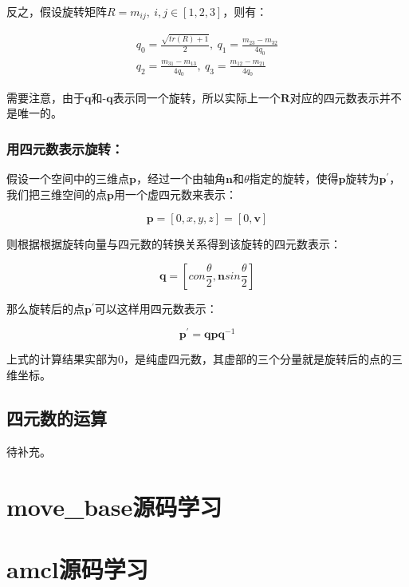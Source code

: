 \documentclass[10pt, oneside]{book}
\begin{document}
反之，假设旋转矩阵$R = {m_{ij}},\ i,j\in [1,2,3]$，则有：

\begin{equation}
    \begin{split}
        q_0 = \frac{\sqrt{tr(R)+1}}{2},\ 
        q_1 = \frac{m_{23}-m_{32}}{4q_0}\\
        q_2 = \frac{m_{31}-m_{13}}{4q_0},\ 
        q_3 = \frac{m_{12}-m_{21}}{4q_0}
    \end{split}
\end{equation}

需要注意，由于$\textbf{q}$和$\textbf{-q}$表示同一个旋转，所以实际上一个$\textbf{R}$对应的四元数表示并不是唯一的。

\subsubsection{用四元数表示旋转：}

假设一个空间中的三维点$\textbf{p}$，经过一个由轴角$\textbf{n}$和$\theta$指定的旋转，使得$\textbf{p}$旋转为$\textbf{p}^\prime$，我们把三维空间的点$\textbf{p}$用一个虚四元数来表示：

\begin{equation}
    \textbf{p} = [0,x,y,z] = [0,\textbf{v}]
\end{equation}

则根据根据旋转向量与四元数的转换关系得到该旋转的四元数表示：

\begin{equation}
    \textbf{q} = [con\frac{\theta}{2},\textbf{n}sin\frac{\theta}{2}]
\end{equation}

那么旋转后的点$\textbf{p}^\prime$可以这样用四元数表示：

\begin{equation}
    \textbf{p}^\prime = \textbf{qpq}^{-1}
\end{equation}

上式的计算结果实部为0，是纯虚四元数，其虚部的三个分量就是旋转后的点的三维坐标。

\subsection{四元数的运算}

待补充。

\section{move\_base源码学习}

\section{amcl源码学习}
\end{document}
